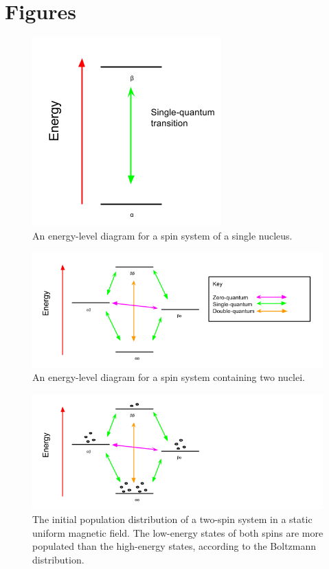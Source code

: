 \clearpage
\section{Figures}

\begin{figure}[h]
  \includegraphics[scale=0.5]{figures/one_spin_1-2}
  \caption{An energy-level diagram for a spin system of a single nucleus.}
  \label{one_spin_1-2}
\end{figure}

\begin{figure}[h]
  \includegraphics[scale=0.5]{figures/two_spins_1-2}
  \caption{An energy-level diagram for a spin system containing two nuclei.}
  \label{two_spins_1-2}
\end{figure}

\begin{figure}[h]
  \includegraphics[scale=0.5]{figures/two_spins_initial}
  \caption[The initial population distribution of a two-spin system.]
          {The initial population distribution of a two-spin system in a 
           static uniform magnetic field.  The low-energy states of both
           spins are more populated than the high-energy states, according to
           the Boltzmann distribution.}
  \label{two_spins_initial}
\end{figure}

